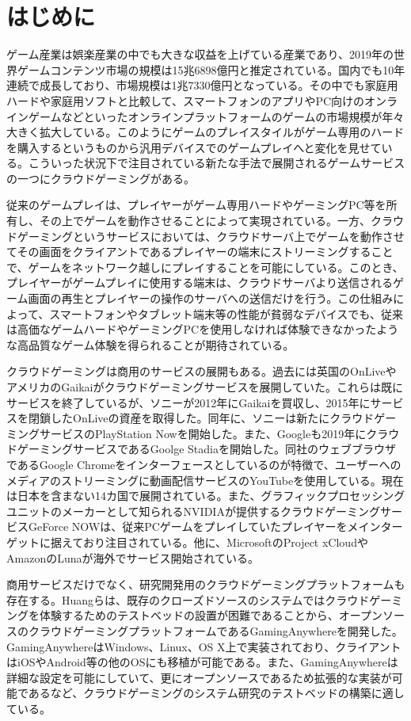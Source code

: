 \section{はじめに}
ゲーム産業は娯楽産業の中でも大きな収益を上げている産業であり、2019年の世界ゲームコンテンツ市場の規模は15兆6898億円と推定されている\cite{prtimes}。国内でも10年連続で成長しており、市場規模は1兆7330億円となっている。その中でも家庭用ハードや家庭用ソフトと比較して、スマートフォンのアプリやPC向けのオンラインゲームなどといったオンラインプラットフォームのゲームの市場規模が年々大きく拡大している。このようにゲームのプレイスタイルがゲーム専用のハードを購入するというものから汎用デバイスでのゲームプレイへと変化を見せている。こういった状況下で注目されている新たな手法で展開されるゲームサービスの一つにクラウドゲーミングがある。

従来のゲームプレイは、プレイヤーがゲーム専用ハードやゲーミングPC等を所有し、その上でゲームを動作させることによって実現されている。一方、クラウドゲーミングというサービスにおいては、クラウドサーバ上でゲームを動作させてその画面をクライアントであるプレイヤーの端末にストリーミングすることで、ゲームをネットワーク越しにプレイすることを可能にしている。このとき、プレイヤーがゲームプレイに使用する端末は、クラウドサーバより送信されるゲーム画面の再生とプレイヤーの操作のサーバへの送信だけを行う。この仕組みによって、スマートフォンやタブレット端末等の性能が貧弱なデバイスでも、従来は高価なゲームハードやゲーミングPCを使用しなければ体験できなかったような高品質なゲーム体験を得られることが期待されている。

クラウドゲーミングは商用のサービスの展開もある。過去には英国のOnLive\cite{onlive}やアメリカのGaikaiがクラウドゲーミングサービスを展開していた。これらは既にサービスを終了しているが、ソニーが2012年にGaikaiを買収し、2015年にサービスを閉鎖したOnLiveの資産を取得した\cite{onlive-sony-gaikai}。同年に、ソニーは新たにクラウドゲーミングサービスのPlayStation Now\cite{ps-now}を開始した。また、Googleも2019年にクラウドゲーミングサービスであるGoolge Stadia\cite{stadia}を開始した。同社のウェブブラウザであるGoogle Chromeをインターフェースとしているのが特徴で、ユーザーへのメディアのストリーミングに動画配信サービスのYouTubeを使用している。現在は日本を含まない14カ国で展開されている。また、グラフィックプロセッシングユニットのメーカーとして知られるNVIDIAが提供するクラウドゲーミングサービスGeForce NOW\cite{geforce-now}は、従来PCゲームをプレイしていたプレイヤーをメインターゲットに据えており注目されている。他に、MicrosoftのProject xCloudやAmazonのLunaが海外でサービス開始されている。

商用サービスだけでなく、研究開発用のクラウドゲーミングプラットフォームも存在する。Huangら\cite{gaminganywhere}は、既存のクローズドソースのシステムではクラウドゲーミングを体験するためのテストベッドの設置が困難であることから、オープンソースのクラウドゲーミングプラットフォームであるGamingAnywhereを開発した。GamingAnywhereはWindows、Linux、OS X上で実装されており、クライアントはiOSやAndroid等の他のOSにも移植が可能である。また、GamingAnywhereは詳細な設定を可能にしていて、更にオープンソースであるため拡張的な実装が可能であるなど、クラウドゲーミングのシステム研究のテストベッドの構築に適している。

